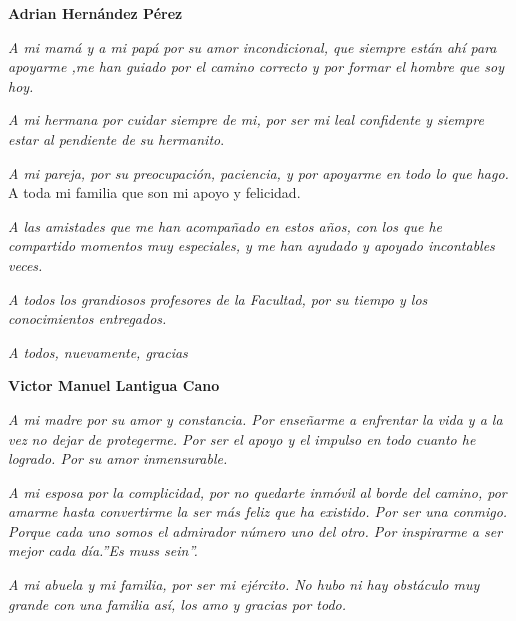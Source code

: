 \begin{acknowledgements}
	
	\begin{flushleft}
	\textbf{ {\LARGE Adrian Hernández Pérez}}
	\newline

	{\large 	\emph{A mi mamá y a mi papá por su amor incondicional, que siempre están ahí para apoyarme ,me han guiado por el camino correcto y por formar el hombre que soy hoy.}
		\newline
		
	\emph{	A mi hermana por cuidar siempre de mi, por ser mi leal confidente y siempre estar al pendiente de su hermanito}.
		\newline
		
	\emph{	A mi pareja, por su preocupación, paciencia, y por apoyarme en todo lo que hago. }
		\newline
		A toda mi familia que son mi apoyo y felicidad.
		\newline
		
	\emph{	A las amistades que me han acompañado en estos años, con los que he compartido momentos muy especiales, y me han ayudado y apoyado incontables veces.}
		\newline
		
	\emph{	A todos los grandiosos  profesores de la Facultad, por su tiempo y los conocimientos entregados.}
		\newline
		
		\emph{A todos, nuevamente, gracias}}
	
	\newpage

	\textbf{ {\LARGE Victor Manuel Lantigua Cano}}
		\newline
	
		{\large
		\emph{	A mi madre por su amor y constancia. Por enseñarme a enfrentar la vida y a la vez no dejar de protegerme. Por ser el apoyo y el impulso en todo cuanto he logrado. Por su amor inmensurable.}
			\newline
			
		\emph{	A mi esposa por la complicidad, por no quedarte inmóvil al borde del camino, por amarme hasta convertirme la ser más feliz que ha existido. Por ser una conmigo. Porque cada uno somos el admirador número uno del otro. Por inspirarme a ser mejor cada día.\linebreak''Es muss sein''.}
			\newline
	
		\emph{	A mi abuela y mi familia, por ser mi ejército. No hubo ni hay obstáculo muy grande con una familia así, los amo y gracias por todo. }
			\newline
			
}
\end{flushleft}
\end{acknowledgements}
